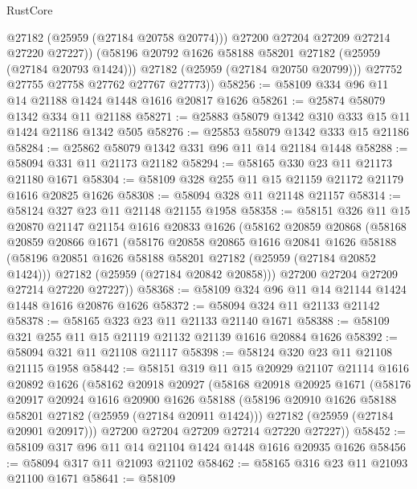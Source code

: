 \begin{lexlean}{RustCore}
\begin{coremodule}
                @27182
                (@25959 (@27184 @20758 @20774)))
              @27200
              @27204
              @27209
              @27214
              @27220
              @27227))
          (@58196 @20792 @1626 @58188 @58201 @27182 (@25959 (@27184 @20793 @1424)))
          @27182
          (@25959 (@27184 @20750 @20799)))
        @27752
        @27755
        @27758
        @27762
        @27767
        @27773))
@58256 := @58109 @334 @96 @11 @14 @21188 @1424 @1448 @1616 @20817 @1626
@58261 := @25874 @58079 @1342 @334 @11 @21188
@58271 := @25883 @58079 @1342 @310 @333 @15 @11 @1424 @21186 @1342 @505
@58276 := @25853 @58079 @1342 @333 @15 @21186
@58284 := @25862 @58079 @1342 @331 @96 @11 @14 @21184 @1448
@58288 := @58094 @331 @11 @21173 @21182
@58294 := @58165 @330 @23 @11 @21173 @21180 @1671
@58304 := @58109 @328 @255 @11 @15 @21159 @21172 @21179 @1616 @20825 @1626
@58308 := @58094 @328 @11 @21148 @21157
@58314 := @58124 @327 @23 @11 @21148 @21155 @1958
@58358 := @58151
    @326
    @11
    @15
    @20870
    @21147
    @21154
    @1616
    @20833
    @1626
    (@58162
      @20859
      @20868
      (@58168
        @20859
        @20866
        @1671
        (@58176
          @20858
          @20865
          @1616
          @20841
          @1626
          @58188
          (@58196 @20851 @1626 @58188 @58201 @27182 (@25959 (@27184 @20852 @1424)))
          @27182
          (@25959 (@27184 @20842 @20858)))
        @27200
        @27204
        @27209
        @27214
        @27220
        @27227))
@58368 := @58109 @324 @96 @11 @14 @21144 @1424 @1448 @1616 @20876 @1626
@58372 := @58094 @324 @11 @21133 @21142
@58378 := @58165 @323 @23 @11 @21133 @21140 @1671
@58388 := @58109 @321 @255 @11 @15 @21119 @21132 @21139 @1616 @20884 @1626
@58392 := @58094 @321 @11 @21108 @21117
@58398 := @58124 @320 @23 @11 @21108 @21115 @1958
@58442 := @58151
    @319
    @11
    @15
    @20929
    @21107
    @21114
    @1616
    @20892
    @1626
    (@58162
      @20918
      @20927
      (@58168
        @20918
        @20925
        @1671
        (@58176
          @20917
          @20924
          @1616
          @20900
          @1626
          @58188
          (@58196 @20910 @1626 @58188 @58201 @27182 (@25959 (@27184 @20911 @1424)))
          @27182
          (@25959 (@27184 @20901 @20917)))
        @27200
        @27204
        @27209
        @27214
        @27220
        @27227))
@58452 := @58109 @317 @96 @11 @14 @21104 @1424 @1448 @1616 @20935 @1626
@58456 := @58094 @317 @11 @21093 @21102
@58462 := @58165 @316 @23 @11 @21093 @21100 @1671
@58641 := @58109

\end{coremodule}
\end{lexlean}
